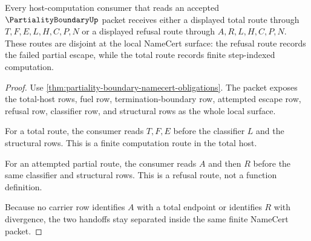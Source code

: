 \begin{theorem}
\label{thm:partiality-boundary-total-host-handoff}
Every host-computation consumer that reads an accepted $\PartialityBoundaryUp$ packet receives either a displayed total route through $T,F,E,L,H,C,P,N$ or a displayed refusal route through $A,R,L,H,C,P,N$. These routes are disjoint at the local NameCert surface: the refusal route records the failed partial escape, while the total route records finite step-indexed computation.
\end{theorem}
\begin{proof}
Use \autoref{thm:partiality-boundary-namecert-obligations}. The packet exposes the total-host rows, fuel row, termination-boundary row, attempted escape row, refusal row, classifier row, and structural rows as the whole local surface.

For a total route, the consumer reads $T,F,E$ before the classifier $L$ and the structural rows. This is a finite computation route in the total host.

For an attempted partial route, the consumer reads $A$ and then $R$ before the same classifier and structural rows. This is a refusal route, not a function definition.

Because no carrier row identifies $A$ with a total endpoint or identifies $R$ with divergence, the two handoffs stay separated inside the same finite NameCert packet.
\end{proof}


\begin{closurestatus}{\PartialityBoundaryUp}
  \theoryclosure{\seedClosure}
  \formalstatus{\unformalizedV}
\end{closurestatus}

